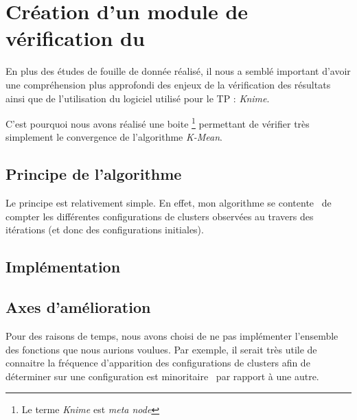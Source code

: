 \newpage
\section{Création d'un module de vérification du }
En plus des études de fouille de donnée réalisé, il nous a semblé important d'avoir une compréhension plus approfondi des enjeux de la vérification des résultats ainsi que de l'utilisation du logiciel utilisé pour le TP : \textsl{Knime}.

C'est pourquoi nous avons réalisé une boite \footnote{Le terme \textsl{Knime} est \textsl{meta node}} permettant de vérifier très simplement le convergence de l'algorithme \textsl{K-Mean}.

\subsection{Principe de l'algorithme}
Le principe est relativement simple. En effet, mon algorithme se \og contente\fg~ de compter les différentes configurations de clusters observées au travers des itérations (et donc des configurations initiales).

\subsection{Implémentation}

\subsection{Axes d'amélioration}
Pour des raisons de temps, nous avons choisi de ne pas implémenter l'ensemble des fonctions que nous aurions voulues. Par exemple, il serait très utile de connaitre la fréquence d'apparition des configurations de clusters afin de déterminer sur une configuration est \og minoritaire\fg~ par rapport à une autre. 


